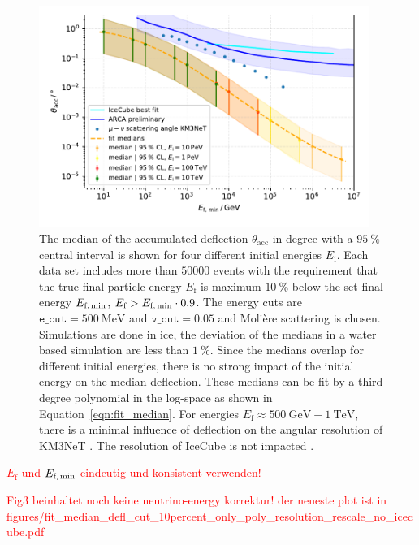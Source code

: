 \begin{figure}
    \centering 
    \includegraphics[width=0.96\textwidth]{../../deflection/plots/FINAL/fit_median_defl_cut_10percent_only_poly_new_resolution_rescale_no_icecube_paper_final.pdf}
    \caption{The median of the accumulated deflection $\theta_{\text{acc}}$ in degree 
    with a $\SI{95}{\percent}$ 
    central interval is shown for four different initial energies $E_{\text{i}}$. 
    Each data set includes more than $\num{50000}$ events with the requirement 
    that the true final particle energy $E_{\text{f}}$ is maximum 
    $\SI{10}{\percent}$ below the set final energy $E_{\text{f,\,min}}$,   
    $E_{\text{f}} > E_{\text{f,\,min}} \cdot 0.9$. The energy cuts are $\texttt{e\_cut} = \SI{500}{\mega\electronvolt}$ and $\texttt{v\_cut} = 0.05$ and 
    Molière scattering is chosen. Simulations are done in ice, the deviation 
    of the medians in a water based simulation are less than $\SI{1}{\percent}$.
    Since the medians overlap for different initial energies, there is no 
    strong impact of the initial energy on the median deflection. These 
    medians can be fit by a third degree polynomial in the log-space as 
    shown in Equation~\ref{eqn:fit_median}. For energies 
    $E_{\text{f}} \approx \SI{500}{\giga\electronvolt} - \SI{1}{\tera\electronvolt}$, there is a minimal influence of deflection on the angular resolution of 
    KM3NeT \cite{KM3NeT_Resolution2016}. The resolution of IceCube is not 
    impacted \cite{IceCube_Resolution2021}.}
    \label{fig:fit_median}
\end{figure}

\textcolor{red}{$E_{\text{f}}$ und $E_{\text{f,\,min}}$ eindeutig und konsistent verwenden!}

\textcolor{red}{Fig3 beinhaltet noch keine neutrino-energy korrektur! der neueste plot ist in figures/fit\_median\_defl\_cut\_10percent\_only\_poly\_resolution\_rescale\_no\_icecube.pdf}

